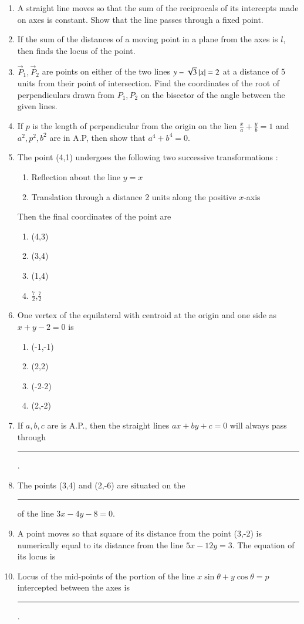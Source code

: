 \begin{enumerate}[label=\thesubsection.\arabic*,ref=\thesubsection.\theenumi]
\item A straight line moves so that the sum of the reciprocals of its intercepts made on axes is constant. Show that the line passes through a fixed point. 
\item If the sum of the distances of a moving point in a plane from the axes is $l$, then finds the locus of the point.  
\item $\vec{P}_1,\vec{P}_2$ are points on either of the two lines $y-\sqrt{3}\left\vert x\right\vert=2$ at a distance of 5 units from their point of intersection. Find the coordinates of the root of perpendiculars drawn from $P_1, P_2$ on the bisector of the angle between the given lines.
\item If $p$ is the length of perpendicular from the origin on the lien $\frac{x}{a}+\frac{y}{b}=1$ and $a^2,p^2,b^2$ are in A.P, then show that $a^4+b^4=0$.
\item The point (4,1) undergoes the following two successive transformations :
\begin{enumerate}
\item Reflection about the line $y=x$
\item Translation through a distance 2 units along the positive $x$-axis 
\end{enumerate}
Then the final coordinates of the point are
\begin{enumerate}
\item (4,3)
\item (3,4)
\item (1,4)
\item $\frac{7}{2}$,$\frac{7}{2}$
\end{enumerate}
\item One vertex of the equilateral with centroid at the origin and one side as $x+y-2=0$ is
\begin{enumerate}
\item (-1,-1)
\item (2,2)
\item (-2-2)
\item (2,-2)
\end{enumerate}
\item If $a,b,c$ are is A.P., then the straight lines $ax+by+c=0$ will always pass through \rule{1cm}{0.15mm}.
\item The points (3,4) and (2,-6) are situated on the \rule{1cm}{0.15mm} of the line $3x-4y-8=0$.
\item A point moves so that square of its distance from the point (3,-2) is numerically equal to its distance from the line $5x-12y=3$. The equation of its locus is %
\item Locus of the mid-points of the portion of the line $x\sin\theta+y\cos\theta=p$ intercepted between the axes is \rule{1cm}{0.15mm}.


\end{enumerate}
